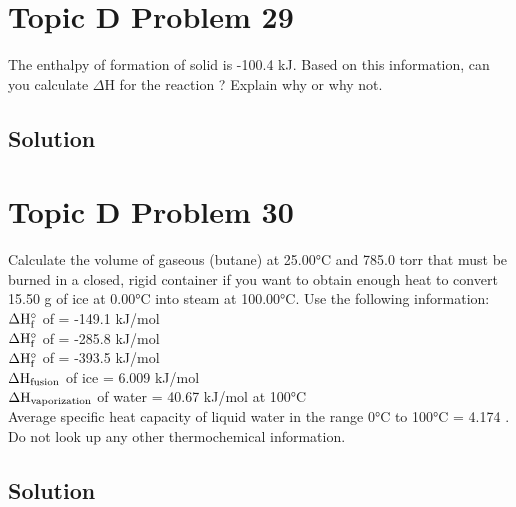 \documentclass[10pt]{article}
\begin{document}
    \pagebreak
    \section{Topic D Problem 29}
        The enthalpy of formation of solid  is -100.4 kJ. 
        Based on this information, can you calculate $\Delta$H for the reaction ? 
        Explain why or why not.

        \subsection{Solution}



    \pagebreak
    \section{Topic D Problem 30}
        Calculate the volume of gaseous  (butane) at 25.00\unit{\celsius} 
        and 785.0 torr that must be burned in a closed, rigid container if you want to obtain enough heat to convert 15.50 g of ice at 0.00\unit{\celsius} into steam at 100.00\unit{\celsius}. 
        Use the following information:\\
        $\rm \Delta H_f^{\circ}$ of  = -149.1 kJ/mol\\
        $\rm \Delta H_f^{\circ}$ of  = -285.8 kJ/mol\\
        $\rm \Delta H_f^{\circ}$ of  = -393.5 kJ/mol\\
        $\rm \Delta H_{fusion}$ of ice = 6.009 kJ/mol\\
        $\rm \Delta H_{vaporization}$ of water = 40.67 kJ/mol at 100\unit{\celsius}\\
        Average specific heat capacity of liquid water in the range 0\unit{\celsius} to 100\unit{\celsius} = 4.174 \unit{\frac{\joule}{\gram\cdot\celsius}}.
        Do not look up any other thermochemical information. 

        \subsection{Solution}


    \setcounter{section}{0}
    \pagebreak
\end{document}
